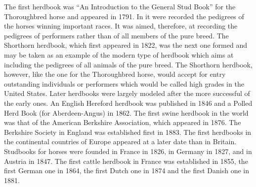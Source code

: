 The first herdbook was ``An Introduction to the General Stud Book'' for the Thoroughbred horse and appeared in 1791. In it 
were recorded the pedigrees of the horses winning important races. It was aimed, therefore, at recording the pedigrees of 
performers rather than of all members of the pure breed. The Shorthorn herdbook, which first appeared in 1822, was the next 
one formed and may be taken as an example of the modern type of herdbook which aims at including the pedigrees of all 
animals of the pure breed. The Shorthorn herdbook, however, like the one for the Thoroughbred horse, would accept for entry 
outstanding individuals or performers which would be called high grades in the United States. Later herdbooks were largely 
modeled after the more successful of the early ones. An English Hereford herdbook was published in 1846 and a Polled Herd 
Book (for Aberdeen-Angus) in 1862. The first swine herdbook in the world was that of the American Berkshire Association, 
which appeared in 1876. The Berkshire Society in England was established first in 1883. The first herdbooks in the 
continental countries of Europe appeared at a later date than in Britain. Studbooks for horses were founded in France in 
1826, in Germany in 1827, and in Austria in 1847. The first cattle herdbook in France was established in 1855, the first 
German one in 1864, the first Dutch one in 1874 and the first Danish one in 1881. 

